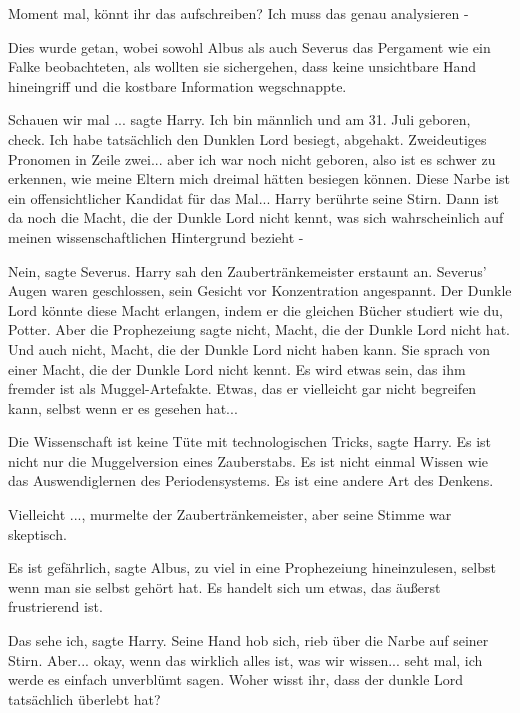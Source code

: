 \glqq Moment mal, könnt ihr das aufschreiben? Ich muss das genau analysieren
-\grqq{}

Dies wurde getan, wobei sowohl Albus als auch Severus das Pergament wie ein
Falke beobachteten, als wollten sie sichergehen, dass keine unsichtbare Hand
hineingriff und die kostbare Information wegschnappte.

\glqq Schauen wir mal ...\grqq{} sagte Harry. \glqq Ich bin männlich und am 31.
Juli geboren, check. Ich habe tatsächlich den Dunklen Lord besiegt, abgehakt.
Zweideutiges Pronomen in Zeile zwei... aber ich war noch nicht geboren, also ist
es schwer zu erkennen, wie meine Eltern mich dreimal hätten besiegen können.
Diese Narbe ist ein offensichtlicher Kandidat für das Mal...\grqq{} Harry
berührte seine Stirn. \glqq Dann ist da noch die Macht, die der Dunkle Lord
nicht kennt, was sich wahrscheinlich auf meinen wissenschaftlichen Hintergrund
bezieht -\grqq{}

\glqq Nein\grqq{}, sagte Severus. Harry sah den Zaubertränkemeister erstaunt an.
Severus' Augen waren geschlossen, sein Gesicht vor Konzentration angespannt.
\glqq Der Dunkle Lord könnte diese Macht erlangen, indem er die gleichen Bücher
studiert wie du, Potter. Aber die Prophezeiung sagte nicht, Macht, die der
Dunkle Lord nicht hat. Und auch nicht, Macht, die der Dunkle Lord nicht haben
kann. Sie sprach von einer Macht, die der Dunkle Lord nicht kennt. Es wird etwas
sein, das ihm fremder ist als Muggel-Artefakte. Etwas, das er vielleicht gar
nicht begreifen kann, selbst wenn er es gesehen hat...\grqq{}

\glqq Die Wissenschaft ist keine Tüte mit technologischen Tricks\grqq{}, sagte
Harry. \glqq Es ist nicht nur die Muggelversion eines Zauberstabs. Es ist nicht
einmal Wissen wie das Auswendiglernen des Periodensystems. Es ist eine andere
Art des Denkens.\grqq{}

\glqq Vielleicht ...\grqq{}, murmelte der Zaubertränkemeister, aber seine Stimme
war skeptisch.

\glqq Es ist gefährlich\grqq{}, sagte Albus, \glqq zu viel in eine Prophezeiung
hineinzulesen, selbst wenn man sie selbst gehört hat. Es handelt sich um etwas,
das äußerst frustrierend ist.\grqq{}

\glqq Das sehe ich\grqq{}, sagte Harry. Seine Hand hob sich, rieb über die Narbe
auf seiner Stirn. \glqq Aber... okay, wenn das wirklich alles ist, was wir
wissen... seht mal, ich werde es einfach unverblümt sagen. Woher wisst ihr, dass
der dunkle Lord tatsächlich überlebt hat?\grqq{}

